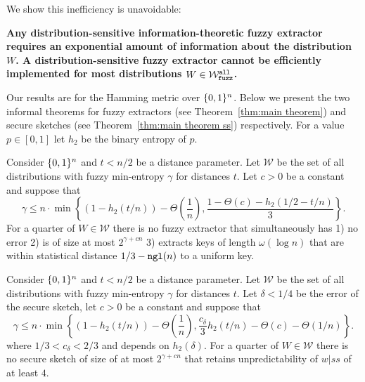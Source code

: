 We show this inefficiency is unavoidable:
\begin{displayquote}
\textbf{Any distribution-sensitive information-theoretic fuzzy extractor requires an exponential amount of information about the distribution $W$.  A distribution-sensitive fuzzy extractor cannot be efficiently implemented for most distributions $W \in \mathcal{W}_{\mathtt{fuzz}}^{\mathtt{all}}$.} 
\end{displayquote} 
Our results are for the Hamming metric over $\{0, 1\}^n$. Below we present the two informal theorems for fuzzy extractors (see Theorem~\ref{thm:main theorem}) and secure sketches (see Theorem~\ref{thm:main theorem ss}) respectively.  For a value $p\in [0,1]$ let $h_2$ be the binary entropy of $p$. 

\begin{theorem}
Consider $\{0, 1\}^n$ and $t< n/2$ be a distance parameter.  Let $\mathcal{W}$ be the set of all distributions with fuzzy min-entropy $\gamma$ for distances $t$.  Let $c>0$ be a constant and suppose that \[
\gamma \le n\cdot\min\left\{(1-h_2(t/n)) - \Theta\left(\frac{1}{n}\right), \frac{1-\Theta(c)-h_2(1/2-t/n)}{3}\right\}.
\]
 For a quarter of $W \in \mathcal{W}$ there is no fuzzy extractor that simultaneously has 1) no error 2) is of size at most $2^{\gamma+cn}$ 3) extracts keys of length $\omega(\log n)$ that are within statistical distance $1/3-\mathtt{ngl}(n)$ to a uniform key.
\end{theorem}

\begin{theorem}
Consider $\{0, 1\}^n$ and $t< n/2$ be a distance parameter.  Let $\mathcal{W}$ be the set of all distributions with fuzzy min-entropy $\gamma$ for distances $t$.  Let $\delta<1/4$ be the error of the secure sketch, let $c>0$ be a constant and suppose that \[
\gamma \le n\cdot\min\left\{(1-h_2(t/n)) - \Theta\left(\frac{1}{n}\right), \frac{c_\delta}{3}h_2(t/n)-\Theta(c)-\Theta(1/n)\right\}.
\]
where $1/3< c_\delta <2/3$ and depends on $h_2(\delta)$. 
 For a quarter of $W \in \mathcal{W}$ there is no secure sketch of
size of at most $2^{\gamma+cn}$ that
 retains unpredictability of $w|ss$ of at  least $4$.
\end{theorem}


